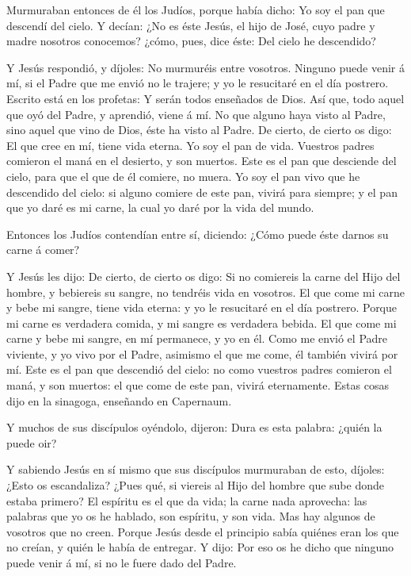  Murmuraban entonces de él los Judíos, porque había dicho:
Yo soy el pan que descendí del cielo.  Y decían: ¿No es
éste Jesús, el hijo de José, cuyo padre y madre nosotros conocemos?
¿cómo, pues, dice éste: Del cielo he descendido?

 Y Jesús respondió, y díjoles: No murmuréis entre vosotros.
 Ninguno puede venir á mí, si el Padre que me envió no le
trajere; y yo le resucitaré en el día postrero.  Escrito
está en los profetas: Y serán todos enseñados de Dios. Así que, todo
aquel que oyó del Padre, y aprendió, viene á mí.  No que
alguno haya visto al Padre, sino aquel que vino de Dios, éste ha visto
al Padre.  De cierto, de cierto os digo: El que cree en mí,
tiene vida eterna.  Yo soy el pan de vida. 
Vuestros padres comieron el maná en el desierto, y son muertos.
 Este es el pan que desciende del cielo, para que el que de
él comiere, no muera.  Yo soy el pan vivo que he descendido
del cielo: si alguno comiere de este pan, vivirá para siempre; y el pan
que yo daré es mi carne, la cual yo daré por la vida del mundo.

 Entonces los Judíos contendían entre sí, diciendo: ¿Cómo
puede éste darnos su carne á comer?

 Y Jesús les dijo: De cierto, de cierto os digo: Si no
comiereis la carne del Hijo del hombre, y bebiereis su sangre, no
tendréis vida en vosotros.  El que come mi carne y bebe mi
sangre, tiene vida eterna: y yo le resucitaré en el día postrero.
 Porque mi carne es verdadera comida, y mi sangre es
verdadera bebida.  El que come mi carne y bebe mi sangre,
en mí permanece, y yo en él.  Como me envió el Padre
viviente, y yo vivo por el Padre, asimismo el que me come, él también
vivirá por mí.  Este es el pan que descendió del cielo: no
como vuestros padres comieron el maná, y son muertos: el que come de
este pan, vivirá eternamente.  Estas cosas dijo en la
sinagoga, enseñando en Capernaum.

 Y muchos de sus discípulos oyéndolo, dijeron: Dura es esta
palabra: ¿quién la puede oir?

 Y sabiendo Jesús en sí mismo que sus discípulos murmuraban
de esto, díjoles: ¿Esto os escandaliza?  ¿Pues qué, si
viereis al Hijo del hombre que sube donde estaba primero? 
El espíritu es el que da vida; la carne nada aprovecha: las palabras que
yo os he hablado, son espíritu, y son vida.  Mas hay
algunos de vosotros que no creen. Porque Jesús desde el principio sabía
quiénes eran los que no creían, y quién le había de entregar.
 Y dijo: Por eso os he dicho que ninguno puede venir á mí,
si no le fuere dado del Padre.

